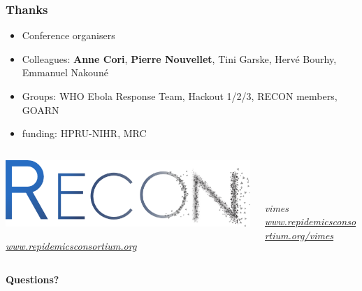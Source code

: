 \documentclass[Xcolor=svgnames,mathserif]{beamer}
\begin{document}
\begin{frame}[fragile]
  \frametitle{Thanks}

  \small
  \begin{itemize}
  \item \alert{Conference organisers}
  \item \alert{Colleagues:} \textbf{Anne Cori}, \textbf{Pierre Nouvellet}, Tini Garske, Hervé Bourhy, Emmanuel Nakouné
  \item \alert{Groups:} WHO Ebola Response Team, Hackout 1/2/3, RECON members, GOARN
  \item \alert{funding:} HPRU-NIHR, MRC
  \end{itemize}

  
  \begin{center}

    \begin{columns}
      \begin{column}{0.5\textwidth}
        \centering
        \includegraphics[width=.75\textwidth]{figs/recon-logo}
        
        {\footnotesize \emph{\url{www.repidemicsconsortium.org}}}
      \end{column}
      
      \begin{column}{0.5\textwidth}
        \centering
        ~\\~\\~\\
            {\huge \alert{\emph{vimes}}}\\
        {\footnotesize \emph{\url{www.repidemicsconsortium.org/vimes}}}
      \end{column}
    \end{columns}
    \vspace{.3cm}
    {\huge \textbf{Questions?}}
    
  \end{center}

  
\end{frame}
\end{document}

